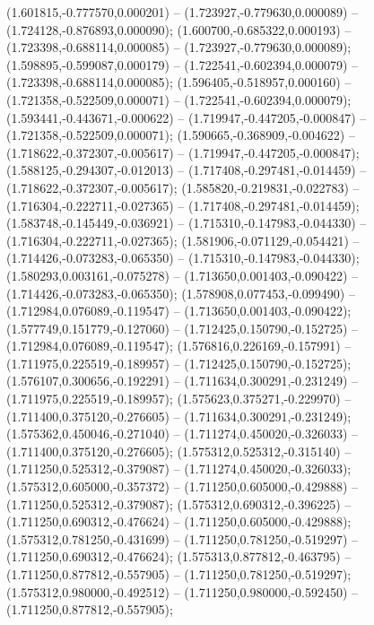  (1.601815,-0.777570,0.000201) -- (1.723927,-0.779630,0.000089) -- (1.724128,-0.876893,0.000090);
 (1.600700,-0.685322,0.000193) -- (1.723398,-0.688114,0.000085) -- (1.723927,-0.779630,0.000089);
 (1.598895,-0.599087,0.000179) -- (1.722541,-0.602394,0.000079) -- (1.723398,-0.688114,0.000085);
 (1.596405,-0.518957,0.000160) -- (1.721358,-0.522509,0.000071) -- (1.722541,-0.602394,0.000079);
 (1.593441,-0.443671,-0.000622) -- (1.719947,-0.447205,-0.000847) -- (1.721358,-0.522509,0.000071);
 (1.590665,-0.368909,-0.004622) -- (1.718622,-0.372307,-0.005617) -- (1.719947,-0.447205,-0.000847);
 (1.588125,-0.294307,-0.012013) -- (1.717408,-0.297481,-0.014459) -- (1.718622,-0.372307,-0.005617);
 (1.585820,-0.219831,-0.022783) -- (1.716304,-0.222711,-0.027365) -- (1.717408,-0.297481,-0.014459);
 (1.583748,-0.145449,-0.036921) -- (1.715310,-0.147983,-0.044330) -- (1.716304,-0.222711,-0.027365);
 (1.581906,-0.071129,-0.054421) -- (1.714426,-0.073283,-0.065350) -- (1.715310,-0.147983,-0.044330);
 (1.580293,0.003161,-0.075278) -- (1.713650,0.001403,-0.090422) -- (1.714426,-0.073283,-0.065350);
 (1.578908,0.077453,-0.099490) -- (1.712984,0.076089,-0.119547) -- (1.713650,0.001403,-0.090422);
 (1.577749,0.151779,-0.127060) -- (1.712425,0.150790,-0.152725) -- (1.712984,0.076089,-0.119547);
 (1.576816,0.226169,-0.157991) -- (1.711975,0.225519,-0.189957) -- (1.712425,0.150790,-0.152725);
 (1.576107,0.300656,-0.192291) -- (1.711634,0.300291,-0.231249) -- (1.711975,0.225519,-0.189957);
 (1.575623,0.375271,-0.229970) -- (1.711400,0.375120,-0.276605) -- (1.711634,0.300291,-0.231249);
 (1.575362,0.450046,-0.271040) -- (1.711274,0.450020,-0.326033) -- (1.711400,0.375120,-0.276605);
 (1.575312,0.525312,-0.315140) -- (1.711250,0.525312,-0.379087) -- (1.711274,0.450020,-0.326033);
 (1.575312,0.605000,-0.357372) -- (1.711250,0.605000,-0.429888) -- (1.711250,0.525312,-0.379087);
 (1.575312,0.690312,-0.396225) -- (1.711250,0.690312,-0.476624) -- (1.711250,0.605000,-0.429888);
 (1.575312,0.781250,-0.431699) -- (1.711250,0.781250,-0.519297) -- (1.711250,0.690312,-0.476624);
 (1.575313,0.877812,-0.463795) -- (1.711250,0.877812,-0.557905) -- (1.711250,0.781250,-0.519297);
 (1.575312,0.980000,-0.492512) -- (1.711250,0.980000,-0.592450) -- (1.711250,0.877812,-0.557905);
